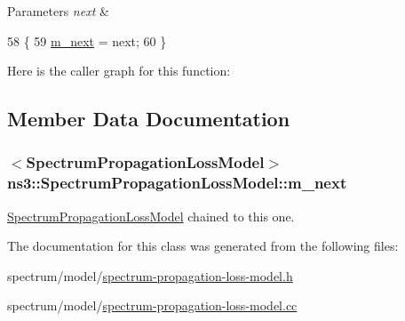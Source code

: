 \begin{DoxyParams}{Parameters}
{\em next} & \\
\hline
\end{DoxyParams}

\begin{DoxyCode}
58 \{
59   \hyperlink{classns3_1_1SpectrumPropagationLossModel_a890bb05ba16564f1fb885359f06d2583}{m\_next} = next;
60 \}
\end{DoxyCode}


Here is the caller graph for this function\+:




\subsection{Member Data Documentation}
\subsubsection[{\texorpdfstring{m\+\_\+next}{m_next}}]{$<${\bf Spectrum\+Propagation\+Loss\+Model}$>$ ns3\+::\+Spectrum\+Propagation\+Loss\+Model\+::m\+\_\+next\hspace{0.3cm}{\ttfamily [private]}}\hypertarget{classns3_1_1SpectrumPropagationLossModel_a890bb05ba16564f1fb885359f06d2583}{}\label{classns3_1_1SpectrumPropagationLossModel_a890bb05ba16564f1fb885359f06d2583}


\hyperlink{classns3_1_1SpectrumPropagationLossModel}{Spectrum\+Propagation\+Loss\+Model} chained to this one. 



The documentation for this class was generated from the following files\+:\begin{DoxyCompactItemize}
\item 
spectrum/model/\hyperlink{spectrum-propagation-loss-model_8h}{spectrum-\/propagation-\/loss-\/model.\+h}\item 
spectrum/model/\hyperlink{spectrum-propagation-loss-model_8cc}{spectrum-\/propagation-\/loss-\/model.\+cc}\end{DoxyCompactItemize}
